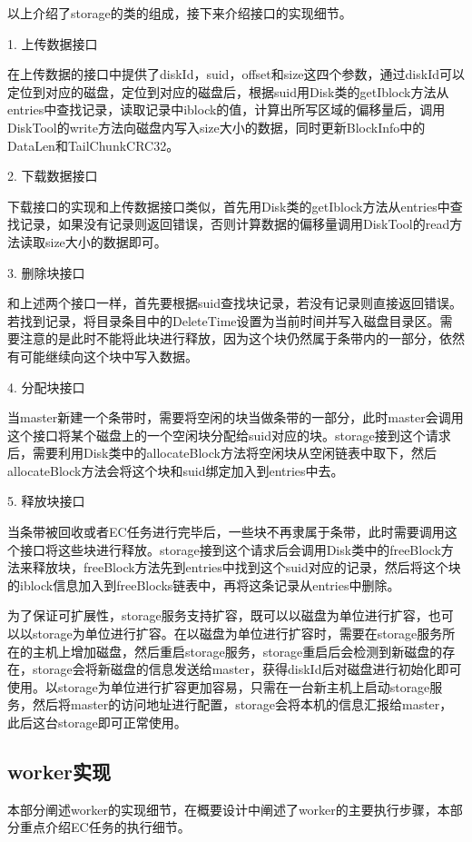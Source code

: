 以上介绍了storage的类的组成，接下来介绍接口的实现细节。

1. 上传数据接口

在上传数据的接口中提供了diskId，suid，offset和size这四个参数，通过diskId可以定位到对应的磁盘，定位到对应的磁盘后，根据suid用Disk类的getIblock方法从entries中查找记录，读取记录中iblock的值，计算出所写区域的偏移量后，调用DiskTool的write方法向磁盘内写入size大小的数据，同时更新BlockInfo中的DataLen和TailChunkCRC32。

2. 下载数据接口

下载接口的实现和上传数据接口类似，首先用Disk类的getIblock方法从entries中查找记录，如果没有记录则返回错误，否则计算数据的偏移量调用DiskTool的read方法读取size大小的数据即可。

3. 删除块接口

和上述两个接口一样，首先要根据suid查找块记录，若没有记录则直接返回错误。若找到记录，将目录条目中的DeleteTime设置为当前时间并写入磁盘目录区。需要注意的是此时不能将此块进行释放，因为这个块仍然属于条带内的一部分，依然有可能继续向这个块中写入数据。

4. 分配块接口

当master新建一个条带时，需要将空闲的块当做条带的一部分，此时master会调用这个接口将某个磁盘上的一个空闲块分配给suid对应的块。storage接到这个请求后，需要利用Disk类中的allocateBlock方法将空闲块从空闲链表中取下，然后allocateBlock方法会将这个块和suid绑定加入到entries中去。

5. 释放块接口

当条带被回收或者EC任务进行完毕后，一些块不再隶属于条带，此时需要调用这个接口将这些块进行释放。storage接到这个请求后会调用Disk类中的freeBlock方法来释放块，freeBlock方法先到entries中找到这个suid对应的记录，然后将这个块的iblock信息加入到freeBlocks链表中，再将这条记录从entries中删除。

为了保证可扩展性，storage服务支持扩容，既可以以磁盘为单位进行扩容，也可以以storage为单位进行扩容。在以磁盘为单位进行扩容时，需要在storage服务所在的主机上增加磁盘，然后重启storage服务，storage重启后会检测到新磁盘的存在，storage会将新磁盘的信息发送给master，获得diskId后对磁盘进行初始化即可使用。以storage为单位进行扩容更加容易，只需在一台新主机上启动storage服务，然后将master的访问地址进行配置，storage会将本机的信息汇报给master，此后这台storage即可正常使用。

\subsection{worker实现}%
本部分阐述worker的实现细节，在概要设计中阐述了worker的主要执行步骤，本部分重点介绍EC任务的执行细节。


